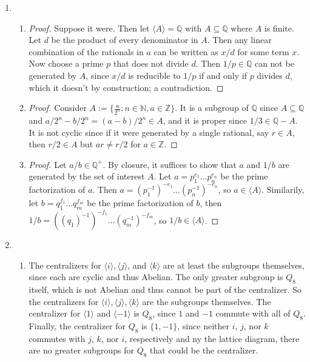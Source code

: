 \documentclass[11pt, letterpaper]{article}
\begin{document}
\thispagestyle{firststyle}


\begin{enumerate}
  \item \begin{enumerate}
    \item \begin{proof}
      Suppose it were. Then let $\langle A \rangle = \mathbb Q$ with $A \subseteq \mathbb Q$ where $A$ is finite. Let $d$ be the product of every denominator in $A$. Then any linear combination of the rationals in $a$ can be written as $x/d$ for some term $x$. Now choose a prime $p$ that does not divide $d$. Then $1/p \in \mathbb Q$ can not be generated by $A$, since $x/d$ is reducible to $1/p$ if and only if $p$ divides $d$, which it doesn't by construction; a contradiction.
    \end{proof}
    \item \begin{proof} Consider $A := \lbrace \frac{a}{2^n} : n \in \mathbb N, a \in \mathbb Z \rbrace$. It is a subgroup of $\mathbb Q$ since $A \subseteq \mathbb Q$ and $a/2^n - b/2^n = (a - b)/2^n \in A$, and it is proper since $1/3 \in \mathbb Q - A$. It is not cyclic since if it were generated by a single rational, say $r \in A$, then $r/2 \in A$ but $ar \neq r/2$ for $a \in \mathbb Z$.
    \end{proof}
    \item \begin{proof}
      Let $a/b \in \mathbb Q^+$. By closure, it suffices to show that $a$ and $1/b$ are generated by the set of interest $A$. Let $a = p_1^{e_1}\dots p_n^{e_n}$ be the prime factorization of $a$. Then $a = (p_1^{-1})^{-e_1} \dots (p_n^{-1})^{-e_n}$, so $a \in \langle A \rangle$. Similarily, let $b = q_1^{f_1} \dots q_m^{f_m}$ be the prime factorization of $b$, then $1/b = ((q_1)^{-1})^{-f_1}\dots (q_m^{-1})^{-f_m}$, so $1/b \in \langle A \rangle$. 
    \end{proof}
  \end{enumerate}
  \item \begin{enumerate}
    \item The centralizers for $\langle i \rangle, \langle j \rangle$, and $\langle k \rangle$ are at least the subgroups themselves, since each are cyclic and thus Abelian. The only greater subgroup is $Q_8$ itself, which is not Abelian and thus cannot be part of the centralizer. So the centralizers for $\langle i \rangle, \langle j \rangle, \langle k \rangle$ are the subgroups themselves. The centralizer for $\langle 1 \rangle$ and $\langle -1 \rangle$ is $Q_8$, since $1$ and $-1$ commute with all of $Q_8$. Finally, the centralizer for $Q_8$ is $\lbrace 1, -1 \rbrace$, since neither $i$, $j$, nor $k$ commutes with $j$, $k$, nor $i$, respectively and ny the lattice diagram, there are no greater subgroups for $Q_8$ that could be the centralizer.
    

\end{enumerate}
\end{enumerate}
\end{document}
